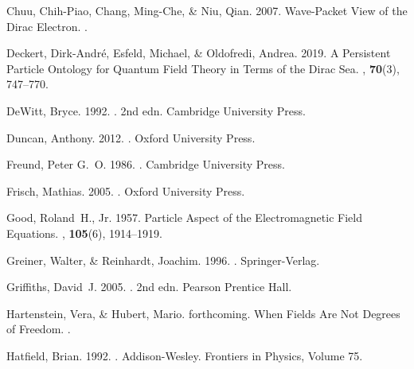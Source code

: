\documentclass[12pt,secnumarabic,amsmath,amssymb,balancelastpage,nofootinbib]{article}
\begin{document}
\begin{thebibliography}{}
Chuu, Chih-Piao, Chang, Ming-Che, \& Niu, Qian. 2007.
\newblock Wave-Packet View of the Dirac Electron.
.

Deckert, Dirk-Andr\'{e}, Esfeld, Michael, \& Oldofredi, Andrea. 2019.
\newblock A Persistent Particle Ontology for Quantum Field Theory in Terms of
  the Dirac Sea.
, {\bf 70}(3),
  747--770.

DeWitt, Bryce. 1992.
. 2nd edn.
\newblock Cambridge University Press.

Duncan, Anthony. 2012.
.
\newblock Oxford University Press.

Freund, Peter G.~O. 1986.
.
\newblock Cambridge University Press.

Frisch, Mathias. 2005.
.
\newblock Oxford University Press.

Good, Roland~H., Jr. 1957.
\newblock Particle Aspect of the Electromagnetic Field Equations.
, {\bf 105}(6), 1914--1919.

Greiner, Walter, \& Reinhardt, Joachim. 1996.
.
\newblock Springer-Verlag.

Griffiths, David~J. 2005.
. 2nd edn.
\newblock Pearson Prentice Hall.

Hartenstein, Vera, \& Hubert, Mario. forthcoming.
\newblock When Fields Are Not Degrees of Freedom.
.

Hatfield, Brian. 1992.
.
\newblock Addison-Wesley.
\newblock Frontiers in Physics, Volume 75.


\end{thebibliography}
\end{document}
